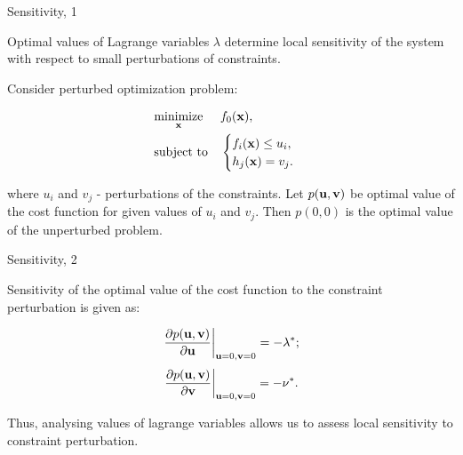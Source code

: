 \documentclass{beamer}
\begin{document}
\begin{frame}{Sensitivity, 1}
	\begin{flushleft}
		
		
		Optimal values of Lagrange variables $\lambda$ determine local sensitivity of the system with respect to small perturbations of constraints.
		
		\bigskip
		
		Consider perturbed optimization problem:
		
		\begin{equation}
			\begin{aligned}
				& \underset{\mathbf{x}}{\text{minimize}}
				& & f_0(\mathbf{x}), \\
				& \text{subject to}
				& & \begin{cases}
					f_i(\mathbf{x}) \leq u_i, \\
					h_j(\mathbf{x}) = v_j.
				\end{cases}
			\end{aligned}
		\end{equation}
		
		where $u_i$ and $v_j$ - perturbations of the constraints. Let $p(\mathbf{u}, \mathbf{v})$ be optimal value of the cost function for given values of $u_i$ and $v_j$. Then $p(0, 0)$ is the optimal value of the unperturbed problem.
		
		
	\end{flushleft}
\end{frame}






\begin{frame}{Sensitivity, 2}
	\begin{flushleft}
		
		Sensitivity of the optimal value of the cost function to the constraint perturbation is given as:
		
		\begin{align}
			\left. \frac{\partial p(\mathbf{u}, \mathbf{v})}{\partial \mathbf{u}} \right\vert_{\mathbf{u}=0, \mathbf{v}=0} =
			- \lambda^*;
		\end{align}
		\begin{align}
		\left. \frac{\partial p(\mathbf{u}, \mathbf{v})}{\partial \mathbf{v}} \right\vert_{\mathbf{u}=0, \mathbf{v}=0}  =
		- \nu^*.
		\end{align}
		
		\bigskip
		
		Thus, analysing values of lagrange variables allows us to assess local sensitivity to constraint perturbation.
		
	\end{flushleft}
\end{frame}
\end{document}
